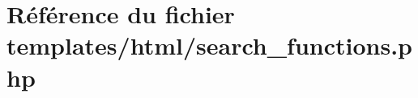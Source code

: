 \hypertarget{search__functions_8php}{}\section{Référence du fichier templates/html/search\+\_\+functions.php}
\label{search__functions_8php}
